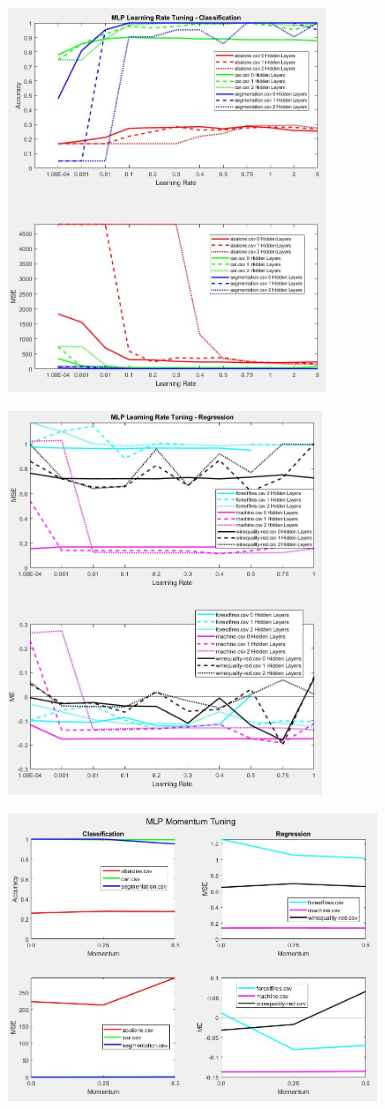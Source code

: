 \documentclass[twoside,11pt]{article}
\begin{document}
\begin{figure}[h]
	\centering
	\includegraphics[height=4in]{FINAL_FIGS/MLP_LR_TUNING_CLASS.JPG}
\end{figure}
\begin{figure}[h]
	\centering
	\includegraphics[height=4in]{FINAL_FIGS/MLP_LR_TUNING_REG.JPG}
\end{figure}
\begin{figure}[h]
	\centering
	\includegraphics[height=3in]{FINAL_FIGS/MLP_MOMENTUM.JPG}
\end{figure}
\end{document}
